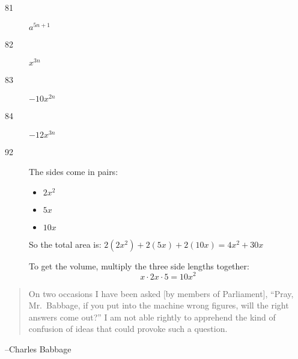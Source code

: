 \documentclass[letterpaper]{exam}
\begin{document}
\begin{description}
          \item[81] $a^{5n+1}$

          \item[82] $x^{3n}$

          \item[83] $-10x^{2n}$

          \item[84] $-12x^{3n}$ 

          \item[92]
              The sides come in pairs: 
              \begin{itemize}
                \item $ 2x^2 $
                \item $ 5x $
                \item $ 10x $
              \end{itemize}

              So the total area is: $ 2(2x^2) + 2(5x) + 2(10x) = 4x^2 + 30x $

              To get the volume, multiply the three side lengths together: 
              \[
                  x \cdot 2x \cdot 5 = 10x^2 
              \]
      \end{description}

  \fi
  \ifprintanswers{}
  \else
    \vspace{3 cm}
    \begin{quote}
      \begin{em}
        On two occasions I have been asked [by members of Parliament], ``Pray, Mr.\ Babbage, if you
        put into the machine wrong figures, will the right answers come out?'' I am not able
        rightly to apprehend the kind of confusion of ideas that could provoke such a question.
      \end{em}
    \end{quote}
    \hspace{2 cm}--Charles Babbage
  \fi
\end{document}
